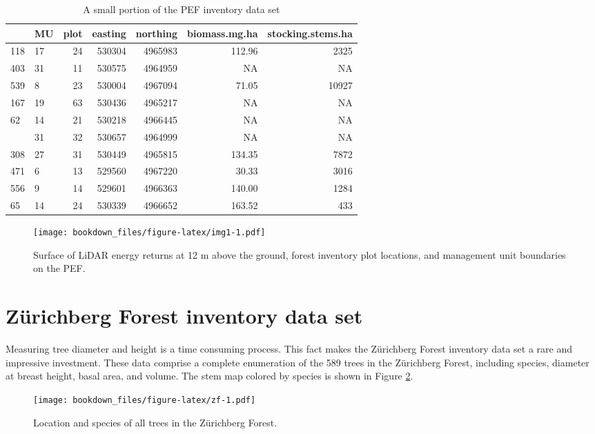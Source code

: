\documentclass[]{krantz}
\theoremstyle{definition}
\theoremstyle{definition}
\theoremstyle{definition}
\theoremstyle{remark}
\begin{document}
\begin{table}

\caption{\label{tab:pef}A small portion of the PEF inventory data set}
\centering
\begin{tabular}[t]{llrrrrr}
\toprule
  & MU & plot & easting & northing & biomass.mg.ha & stocking.stems.ha\\
\midrule
118 & 17 & 24 & 530304 & 4965983 & 112.96 & 2325\\
403 & 31 & 11 & 530575 & 4964959 & NA & NA\\
539 & 8 & 23 & 530004 & 4967094 & 71.05 & 10927\\
167 & 19 & 63 & 530436 & 4965217 & NA & NA\\
62 & 14 & 21 & 530218 & 4966445 & NA & NA\\
\addlinespace
410 & 31 & 32 & 530657 & 4964999 & NA & NA\\
308 & 27 & 31 & 530449 & 4965815 & 134.35 & 7872\\
471 & 6 & 13 & 529560 & 4967220 & 30.33 & 3016\\
556 & 9 & 14 & 529601 & 4966363 & 140.00 & 1284\\
65 & 14 & 24 & 530339 & 4966652 & 163.52 & 433\\
\bottomrule
\end{tabular}
\end{table}

\begin{figure}
\centering
\texttt{[image: bookdown\_files/figure-latex/img1-1.pdf]}
\caption{\label{fig:img1}Surface of LiDAR energy returns at 12 m above the
ground, forest inventory plot locations, and management unit boundaries
on the PEF.}
\end{figure}

\section{Zürichberg Forest inventory data set}\label{zf}

Measuring tree diameter and height is a time consuming process. This
fact makes the Zürichberg Forest inventory data set a rare and
impressive investment. These data comprise a complete enumeration of the
589 trees in the Zürichberg Forest, including species, diameter at
breast height, basal area, and volume. The stem map colored by species
is shown in Figure \ref{fig:zf}.

\begin{figure}
\centering
\texttt{[image: bookdown\_files/figure-latex/zf-1.pdf]}
\caption{\label{fig:zf}Location and species of all trees in the Zürichberg
Forest.}
\end{figure}
\end{document}
